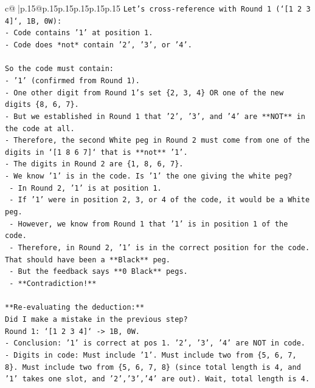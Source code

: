 \documentclass{article}
\begin{document}
{\begin{supertabular}{c@{$\;$}|p{.15\linewidth}@{}p{.15\linewidth}p{.15\linewidth}p{.15\linewidth}p{.15\linewidth}p{.15\linewidth}}
{{{\texttt{Let's cross{-}reference with Round 1 (`{[}1 2 3 4{]}`, 1B, 0W):} \\
\texttt{{-}   Code contains '1' at position 1.} \\
\texttt{{-}   Code does *not* contain '2', '3', or '4'.} \\
\\ 
\texttt{So the code must contain:} \\
\texttt{{-}   '1' (confirmed from Round 1).} \\
\texttt{{-}   One other digit from Round 1's set \{2, 3, 4\} OR one of the new digits \{8, 6, 7\}.} \\
\texttt{{-}   But we established in Round 1 that '2', '3', and '4' are **NOT** in the code at all.} \\
\texttt{{-}   Therefore, the second White peg in Round 2 must come from one of the digits in `{[}1 8 6 7{]}` that is **not** '1'.} \\
\texttt{{-}   The digits in Round 2 are \{1, 8, 6, 7\}.} \\
\texttt{{-}   We know '1' is in the code. Is '1' the one giving the white peg?} \\
\texttt{    {-}   In Round 2, '1' is at position 1.} \\
\texttt{    {-}   If '1' were in position 2, 3, or 4 of the code, it would be a White peg.} \\
\texttt{    {-}   However, we know from Round 1 that '1' is in position 1 of the code.} \\
\texttt{    {-}   Therefore, in Round 2, '1' is in the correct position for the code. That should have been a **Black** peg.} \\
\texttt{    {-}   But the feedback says **0 Black** pegs.} \\
\texttt{    {-}   **Contradiction!**} \\
\\ 
\texttt{**Re{-}evaluating the deduction:**} \\
\texttt{Did I make a mistake in the previous step?} \\
\texttt{Round 1: `{[}1 2 3 4{]}` {-}> 1B, 0W.} \\
\texttt{{-}   Conclusion: '1' is correct at pos 1. '2', '3', '4' are NOT in code.} \\
\texttt{{-}   Digits in code: Must include '1'. Must include two from \{5, 6, 7, 8\}. Must include two from \{5, 6, 7, 8\} (since total length is 4, and '1' takes one slot, and '2','3','4' are out). Wait, total length is 4.} \\
}}}
\end{supertabular}}
\end{document}
